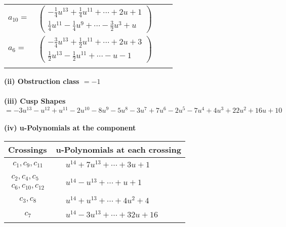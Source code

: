 \documentclass[1p]{elsarticle_modified}
\theoremstyle{definition}
\begin{document}
\begin{tabular}{m{7pt} m{180pt} m{7pt} m{180pt} }
\flushright $a_{10}=$&$\begin{pmatrix}-\frac{1}{4} u^{13}+\frac{1}{4} u^{11}+\cdots+2 u+1\\\frac{1}{4} u^{11}-\frac{1}{4} u^9+\cdots-\frac{3}{2} u^3+u\end{pmatrix}$ \\
\flushright $a_{6}=$&$\begin{pmatrix}-\frac{3}{4} u^{13}+\frac{1}{2} u^{11}+\cdots+2 u+3\\\frac{1}{2} u^{13}-\frac{1}{2} u^{11}+\cdots- u-1\end{pmatrix}$\\&\end{tabular}
\flushleft \textbf{(ii) Obstruction class $= -1$}\\~\\
\flushleft \textbf{(iii) Cusp Shapes $= -3 u^{13}- u^{12}+u^{11}-2 u^{10}-8 u^9-5 u^8-3 u^7+7 u^6-2 u^5-7 u^4+4 u^3+22 u^2+16 u+10$}\\~\\
\newpage\renewcommand{\arraystretch}{1}
\flushleft \textbf{(iv) u-Polynomials at the component}\newline \\
\begin{tabular}{m{50pt}|m{274pt}}
Crossings & \hspace{64pt}u-Polynomials at each crossing \\
\hline $$\begin{aligned}c_{1},c_{9},c_{11}\end{aligned}$$&$\begin{aligned}
&u^{14}+7 u^{13}+\cdots+3 u+1
\end{aligned}$\\
\hline $$\begin{aligned}c_{2},c_{4},c_{5}\\c_{6},c_{10},c_{12}\end{aligned}$$&$\begin{aligned}
&u^{14}- u^{13}+\cdots+u+1
\end{aligned}$\\
\hline $$\begin{aligned}c_{3},c_{8}\end{aligned}$$&$\begin{aligned}
&u^{14}+u^{13}+\cdots+4 u^2+4
\end{aligned}$\\
\hline $$\begin{aligned}c_{7}\end{aligned}$$&$\begin{aligned}
&u^{14}-3 u^{13}+\cdots+32 u+16
\end{aligned}$\\
\hline
\end{tabular}\\~\\
\end{document}
